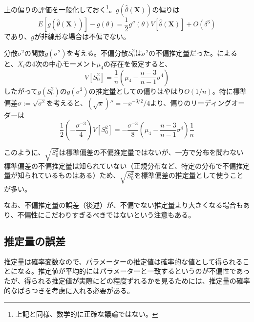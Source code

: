 \documentclass[uplatex,dvipdfmx]{jlreq}
\begin{document}
上の偏りの評価を一般化しておく\footnote{上記と同様、数学的に正確な議論ではない。}。$g(\hat{\theta}(\boldsymbol{X}))$の偏りは
\begin{equation}
    E[g(\hat{\theta}(\boldsymbol{X}))] - g(\theta)
    = \frac{1}{2}g''(\theta)V[\hat{\theta}(\boldsymbol{X})] + O(\delta^3)
\end{equation}
であり、$g$が非線形な場合は不偏でない。

\begin{example}\label{est_sd}
    分散$\sigma^2$の関数$g(\sigma^2)$を考える。不偏分散$S_0^2$は$\sigma^2$の不偏推定量だった。\cite{u_var_var}によると、$X_i$の4次の中心モーメント$\mu_4$の存在を仮定すると、
    \begin{equation}
        V[S_0^2]
        = \frac{1}{n}\left(\mu_4 - \frac{n-3}{n-1}\sigma^4\right)
    \end{equation}
    したがって$g(S_0^2)$の$g(\sigma^2)$の推定量としての偏りはやはり$O(1/n)$。特に標準偏差$\sigma := \sqrt{\sigma^2}$を考えると、$(\sqrt{x})'' = -x^{-3/2}/4$より、偏りのリーディングオーダーは
    \begin{equation}
        \frac{1}{2}\left(-\frac{\sigma^{-3}}{4}\right)V[S_0^2]
        = -\frac{\sigma^{-3}}{8}
        \left(\mu_4 - \frac{n-3}{n-1}\sigma^4\right)
        \frac{1}{n}
    \end{equation}
\end{example}

このように、$\sqrt{S_0^2}$は標準偏差の不偏推定量ではないが、一方で分布を問わない標準偏差の不偏推定量は知られていない（正規分布など、特定の分布で不偏推定量が知られているものはある）ため、$\sqrt{S_0^2}$を標準偏差の推定量として使うことが多い。

なお、不偏推定量の誤差（後述）が、不偏でない推定量より大きくなる場合もあり、不偏性にこだわりすぎるべきではないという注意もある\cite{kuroki}。

\subsection{推定量の誤差}

推定量は確率変数なので、パラメーターの推定値は確率的な値として得られることになる。推定値が平均的にはパラメーターと一致するというのが不偏性であったが、得られる推定値が実際にどの程度ずれるかを見るためには、推定量の確率的なばらつきを考慮に入れる必要がある。
\end{document}
